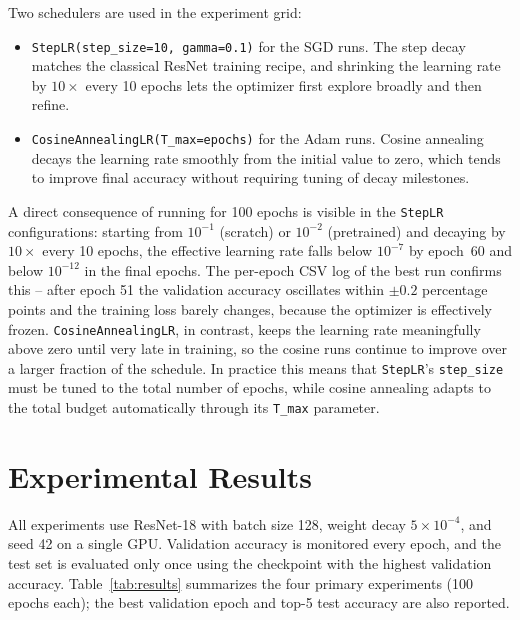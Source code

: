 \documentclass[10pt,a4paper]{article}
\begin{document}
Two schedulers are used in the experiment grid:

\begin{itemize}[leftmargin=*,itemsep=0pt]
    \item \texttt{StepLR(step\_size=10, gamma=0.1)} for the SGD runs. The step decay matches the classical ResNet training recipe, and shrinking the learning rate by $10\times$ every 10 epochs lets the optimizer first explore broadly and then refine.
    \item \texttt{CosineAnnealingLR(T\_max=epochs)} for the Adam runs. Cosine annealing decays the learning rate smoothly from the initial value to zero, which tends to improve final accuracy without requiring tuning of decay milestones.
\end{itemize}

A direct consequence of running for 100 epochs is visible in the \texttt{StepLR} configurations: starting from $10^{-1}$ (scratch) or $10^{-2}$ (pretrained) and decaying by $10\times$ every 10 epochs, the effective learning rate falls below $10^{-7}$ by epoch~60 and below $10^{-12}$ in the final epochs. The per-epoch CSV log of the best run confirms this -- after epoch 51 the validation accuracy oscillates within $\pm 0.2$ percentage points and the training loss barely changes, because the optimizer is effectively frozen. \texttt{CosineAnnealingLR}, in contrast, keeps the learning rate meaningfully above zero until very late in training, so the cosine runs continue to improve over a larger fraction of the schedule. In practice this means that \texttt{StepLR}'s \texttt{step\_size} must be tuned to the total number of epochs, while cosine annealing adapts to the total budget automatically through its \texttt{T\_max} parameter.

\section{Experimental Results}
\label{sec:results}

All experiments use ResNet-18 with batch size 128, weight decay $5\times 10^{-4}$, and seed 42 on a single GPU. Validation accuracy is monitored every epoch, and the test set is evaluated only once using the checkpoint with the highest validation accuracy. Table~\ref{tab:results} summarizes the four primary experiments (100 epochs each); the best validation epoch and top-5 test accuracy are also reported.
\end{document}
